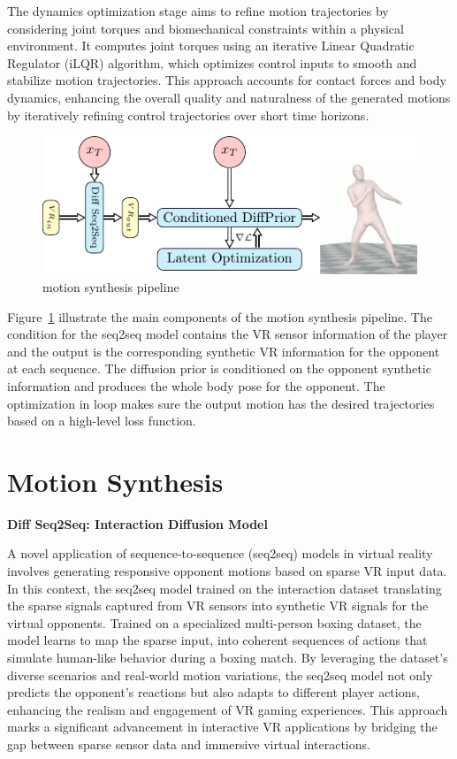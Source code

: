 \documentclass{egpubl}
\begin{document}
The dynamics optimization stage aims to refine motion trajectories by considering joint torques and biomechanical constraints within a physical environment. It computes joint torques using an iterative Linear Quadratic Regulator (iLQR) algorithm, which optimizes control inputs to smooth and stabilize motion trajectories. This approach accounts for contact forces and body dynamics, enhancing the overall quality and naturalness of the generated motions by iteratively refining control trajectories over short time horizons.

\begin{figure}[htbp]
  \centering
  \includegraphics{condiffusion}
  \caption{motion synthesis pipeline}
    \label{fig:condtion-diffusion}
\end{figure}

Figure~\ref{fig:condtion-diffusion} illustrate the main components of the motion synthesis pipeline. The condition for the seq2seq model contains the VR sensor information of the player and the output is the corresponding synthetic VR information for the opponent at each sequence. The diffusion prior is conditioned on the opponent synthetic information and produces the whole body pose for the opponent. The optimization in loop makes sure the output motion has the desired trajectories based on a high-level loss function.



\section{Motion Synthesis}
\textbf{Diff Seq2Seq: Interaction Diffusion Model}
 
A novel application of sequence-to-sequence (seq2seq) models in virtual reality involves generating responsive opponent motions based on sparse VR input data. In this context, the seq2seq model trained on the interaction dataset translating the sparse signals captured from VR sensors into synthetic VR signals for the virtual opponents. Trained on a specialized multi-person boxing dataset, the model learns to map the sparse input, into coherent sequences of actions that simulate human-like behavior during a boxing match. By leveraging the dataset’s diverse scenarios and real-world motion variations, the seq2seq model not only predicts the opponent’s reactions but also adapts to different player actions, enhancing the realism and engagement of VR gaming experiences. This approach marks a significant advancement in interactive VR applications by bridging the gap between sparse sensor data and immersive virtual interactions.
\end{document}
